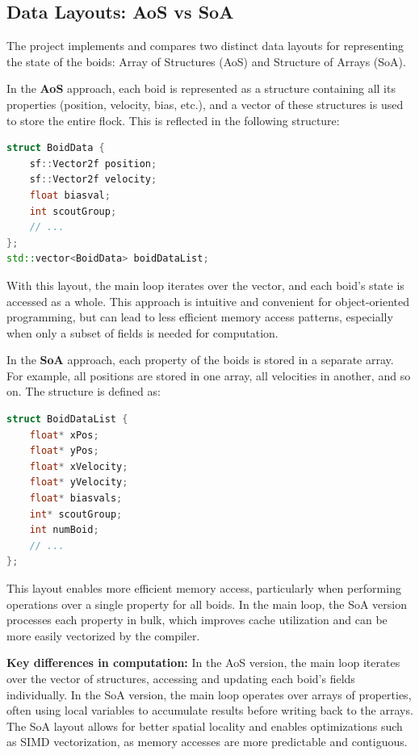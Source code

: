 \documentclass[10pt,twocolumn,letterpaper]{article}
\begin{document}
\subsection{Data Layouts: AoS vs SoA}
The project implements and compares two distinct data layouts for representing the state of the boids: Array of Structures (AoS) and Structure of Arrays (SoA).

In the \textbf{AoS} approach, each boid is represented as a structure containing all its properties (position, velocity, bias, etc.), and a vector of these structures is used to store the entire flock. This is reflected in the following structure:
\begin{lstlisting}[language=C++]
struct BoidData {
    sf::Vector2f position;
    sf::Vector2f velocity;
    float biasval;
    int scoutGroup;
    // ...
};
std::vector<BoidData> boidDataList;
\end{lstlisting}
With this layout, the main loop iterates over the vector, and each boid's state is accessed as a whole. This approach is intuitive and convenient for object-oriented programming, but can lead to less efficient memory access patterns, especially when only a subset of fields is needed for computation.

In the \textbf{SoA} approach, each property of the boids is stored in a separate array. For example, all positions are stored in one array, all velocities in another, and so on. The structure is defined as:
\begin{lstlisting}[language=C++]
struct BoidDataList {
    float* xPos;
    float* yPos;
    float* xVelocity;
    float* yVelocity;
    float* biasvals;
    int* scoutGroup;
    int numBoid;
    // ...
};
\end{lstlisting}
This layout enables more efficient memory access, particularly when performing operations over a single property for all boids. In the main loop, the SoA version processes each property in bulk, which improves cache utilization and can be more easily vectorized by the compiler.

\textbf{Key differences in computation:}
In the AoS version, the main loop iterates over the vector of structures, accessing and updating each boid's fields individually. In the SoA version, the main loop operates over arrays of properties, often using local variables to accumulate results before writing back to the arrays. The SoA layout allows for better spatial locality and enables optimizations such as SIMD vectorization, as memory accesses are more predictable and contiguous.
\end{document}
